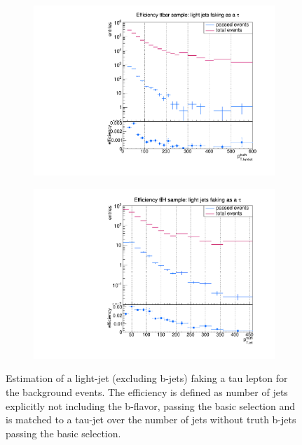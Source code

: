 \begin{figure}
  \centering
                \begin{subfigure}[t]{0.49\textwidth}
                \includegraphics[width=\textwidth]{figures/plots/ttbar/Divided_NoBjet.pdf}
                \label{DividedNoBjet:bg:ttbar}
                \end{subfigure}
                \begin{subfigure}[t]{0.49\textwidth}
                \includegraphics[width=\textwidth]{figures/plots/ttH/Divided_NoBjet.pdf}
                \label{DividedNoBjet:bg:ttH}
                \end{subfigure}
\caption[Estimation of a light-jet faking a tau lepton for the background events.]{Estimation of a light-jet (excluding b-jets) faking a tau lepton for the background events. The efficiency is defined as number of jets explicitly not including the b-flavor, passing the basic selection and is matched to a tau-jet over the number of jets without truth b-jets passing the basic selection.}
\label{DividedNoBjet:bg}
\end{figure}
